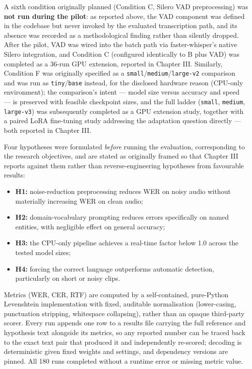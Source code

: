 \documentclass[12pt]{report}
\begin{document}
A sixth condition originally planned (Condition C, Silero VAD preprocessing) was \textbf{not run during the pilot}: as reported above, the VAD component was defined in the codebase but never invoked by the evaluated transcription path, and its absence was recorded as a methodological finding rather than silently dropped. After the pilot, VAD was wired into the batch path via faster-whisper's native Silero integration, and Condition C (configured identically to B plus VAD) was completed as a 36-run GPU extension, reported in Chapter III. Similarly, Condition F was originally specified as a \texttt{small}/\texttt{medium}/\texttt{large-v2} comparison and was run as \texttt{tiny}/\texttt{base} instead, for the disclosed hardware reason (CPU-only environment); the comparison's intent --- model size versus accuracy and speed --- is preserved with feasible checkpoint sizes, and the full ladder (\texttt{small}, \texttt{medium}, \texttt{large-v3}) was subsequently completed as a GPU extension study, together with a paired LoRA fine-tuning study addressing the adaptation question directly --- both reported in Chapter III.

Four hypotheses were formulated \emph{before} running the evaluation, corresponding to the research objectives, and are stated as originally framed so that Chapter III reports against them rather than reverse-engineering hypotheses from favourable results:
\begin{itemize}
    \item \textbf{H1:} noise-reduction preprocessing reduces WER on noisy audio without materially increasing WER on clean audio;
    \item \textbf{H2:} domain-vocabulary prompting reduces errors specifically on named entities, with negligible effect on general accuracy;
    \item \textbf{H3:} the CPU-only pipeline achieves a real-time factor below 1.0 across the tested model sizes;
    \item \textbf{H4:} forcing the correct language outperforms automatic detection, particularly on short or noisy clips.
\end{itemize}

Metrics (WER, CER, RTF) are computed by a self-contained, pure-Python Levenshtein implementation with fixed, auditable normalisation (lower-casing, punctuation stripping, whitespace collapsing), rather than an opaque third-party scorer. Every run appends one row to a results file carrying the full reference and hypothesis text alongside its metrics, so any reported number can be traced back to the exact text pair that produced it and independently re-scored; decoding is deterministic given fixed weights and settings, and dependency versions are pinned. All 180 runs completed without a runtime error or missing metric value.
\end{document}

